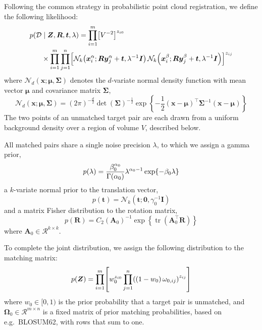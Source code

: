 \documentclass{article}
\newcommand{\lh}{\mathopen{}\mathclose\bgroup\left}
\newcommand{\rh}{\aftergroup\egroup\right}
\newcommand{\m}[1]{\boldsymbol{#1}}
\newcommand{\setD}{\mathcal{D}}
\newcommand{\setR}{\mathcal{R}}
\DeclareMathOperator{\trace}{tr}
\begin{document}
Following the common strategy in probabilistic point cloud registration,
we define the following likelihood:
\begin{equation}
\begin{aligned}
p(\setD &\mid \m{Z}, \m{R}, \m{t}, \lambda) =
 \prod_{i=1}^m \lh[ V^{-2} \rh]^{z_{i0}}
\\
&\times \prod_{i=1}^m \prod_{j=1}^n \lh[
 \mathcal{N}_k\lh(
   \m{x}_i^\alpha; \m{R} \m{y}_j^\alpha + \m{t}, \lambda^{-1} \m{I}
 \rh) \,
 \mathcal{N}_k\lh(
   \m{x}_i^\beta; \m{R} \m{y}_j^\beta + \m{t}, \lambda^{-1} \m{I}
 \rh) \rh]^{z_{ij}}
\end{aligned}
\end{equation}
where $\mathcal{N}_d(\m{x}; \m{\mu}, \m{\Sigma})$ denotes the $d$-variate
normal density function with mean vector $\m{\mu}$ and covariance matrix
$\m{\Sigma}$,
\begin{equation}
\mathcal{N}_d(\m{x}; \m{\mu}, \m{\Sigma}) =
 (2 \pi)^{-\frac{d}{2}}
 \det(\m{\Sigma})^{-\frac{1}{2}}
 \exp\left\{
  -\frac{1}{2} (\m{x} - \m{\mu})^\top \m{\Sigma}^{-1} (\m{x} - \m{\mu})
 \right\}
\end{equation}
The two points of an unmatched target pair are each drawn from a uniform
background density over a region of volume $V$, described below.

All matched pairs share a single noise precision $\lambda$, to which we
assign a gamma prior,
\begin{equation}
p(\lambda) =
 \frac{\beta_0^{\alpha_0}}{\Gamma(\alpha_0)}
  \lambda^{\alpha_0 - 1} \exp\lh\{ -\beta_0 \lambda \rh\}
\end{equation}
a $k$-variate normal prior to the translation vector,
\begin{equation}
p(\m{t}) = \mathcal{N}_k\left( \m{t}; \m{0}, \gamma_0^{-1} \m{I} \right)
\end{equation}
and a matrix Fisher distribution to the rotation matrix,
\begin{equation}
p(\m{R}) =
 C_2(\m{A}_0)^{-1} \exp\left\{ \trace(\m{A}_0^\top \m{R}) \right\}
\end{equation}
where $\m{A}_0 \in \setR^{k \times k}$.

To complete the joint distribution, we assign the following distribution
to the matching matrix:
\begin{equation}
p(\m{Z}) = \prod_{i=1}^m \lh[
  w_0^{z_{i0}}
  \prod_{j=1}^n \lh( (1 - w_0) \, \omega_{0,ij} \rh)^{z_{ij}}
 \rh]
\end{equation}
where $w_0 \in [0, 1)$ is the prior probability that a target pair is
unmatched, and $\m{\Omega}_0 \in \setR^{m \times n}$ is a fixed matrix of
prior matching probabilities, based on e.g.~BLOSUM62, with rows that sum
to one.
\end{document}
